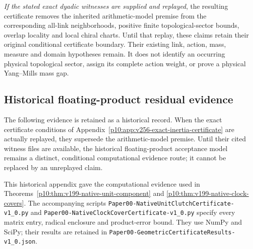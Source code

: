 \documentclass[12pt,a4paper]{article}
\begin{document}
\emph{If the stated exact dyadic witnesses are supplied and replayed}, the
resulting certificate removes the inherited arithmetic-model premise from
the corresponding all-link neighborhoods, positive finite topological-sector
bounds, overlap locality and local chiral charts. Until that replay, these
claims retain their original conditional certificate boundary.
Their existing link, action, mass, measure and domain hypotheses remain.
It does not identify an occurring physical topological sector, assign its
complete action weight, or prove a physical Yang--Mills mass gap.


\subsection{Historical floating-product residual evidence}
\label{p10:app:v199-inertia-certificate}
The following evidence is retained as a historical record. When the exact
certificate conditions of Appendix~\ref{p10:app:v256-exact-inertia-certificate}
are actually replayed, they supersede the arithmetic-model premise.
Until their cited witness files are available, the historical
floating-product acceptance model remains a distinct, conditional
computational evidence route; it cannot be replaced by an unreplayed claim.

This historical appendix gave the computational evidence used in
Theorems~\ref{p10:thm:v199-native-unit-component} and
\ref{p10:thm:v199-native-clock-covers}.  The accompanying scripts
\texttt{Paper00-NativeUnitClutchCertificate-v1\_0.py} and
\texttt{Paper00-NativeClockCoverCertificate-v1\_0.py} specify every matrix
entry, radical enclosure and product-error bound.  They use NumPy and
SciPy; their results are retained in
\texttt{Paper00-GeometricCertificateResults-v1\_0.json}.
\end{document}
